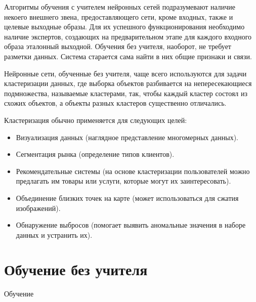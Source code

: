 \documentclass[bachelor, och, referat]{SCWorks}
\begin{document}




\tableofcontents

\intro 
Алгоритмы обучения с учителем нейронных сетей подразумевают наличие некоего внешнего звена, 
предоставляющего сети, кроме входных, также и целевые выходные образы. 
Для их успешного функционирования необходимо наличие экспертов, 
создающих на предварительном этапе для каждого входного образа эталонный выходной. 
Обучения без учителя, наоборот, не требует разметки данных. 
Система старается сама найти в них общие признаки и связи.

Нейронные сети, обученные без учителя, чаще всего используются
для задачи кластеризации данных, где выборка объектов разбивается на непересекающиеся подмножества, 
называемые кластерами, так, чтобы каждый кластер состоял из схожих объектов, 
а объекты разных кластеров существенно отличались. 

Кластеризация обычно применяется для следующих целей:
\begin{itemize}
    \item Визуализация данных (наглядное представление многомерных данных).
    \item Сегментация рынка (определение типов клиентов).
    \item Рекомендательные системы (на основе кластеризации пользователей можно предлагать им товары или услуги, которые могут их заинтересовать).
    \item Объединение близких точек на карте (может использоваться для сжатия изображений).
    \item Обнаружение выбросов (помогает выявить аномальные значения в наборе данных и устранить их).
\end{itemize}

\section{Обучение без учителя}
Обучение
\end{document}
